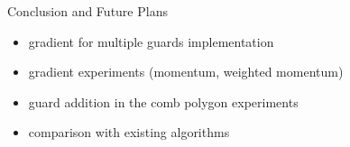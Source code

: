 \documentclass{beamer}
\begin{document}
\begin{frame}{Conclusion and Future Plans}
	\begin{itemize}
		\item gradient for multiple guards implementation
		\item gradient experiments (momentum, weighted momentum)
		\item guard addition in the comb polygon experiments
		\item comparison with existing algorithms \cite{DBLP:journals/corr/abs-2007-06920}
	\end{itemize}
\end{frame}








\end{document}
